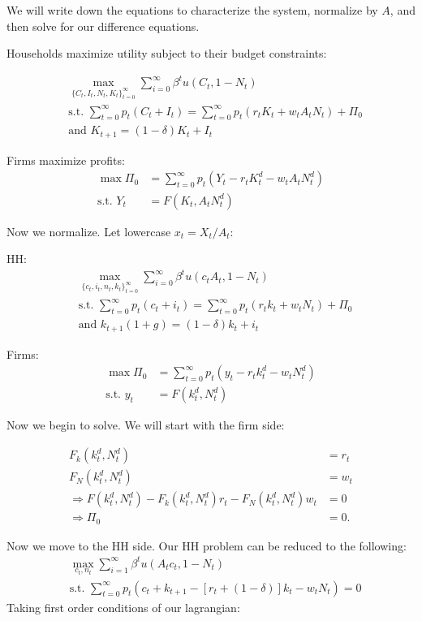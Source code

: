 \documentclass[11pt]{article} %
\begin{document}
We will write down the equations to characterize the system, normalize by $A$, and then solve for our difference equations. 

Households maximize utility subject to their budget constraints:

\begin{align*}
&\max_{\{C_t,I_t,N_t,K_t\}_{t=0}^{\infty}} \sum_{i=0}^{\infty}\beta^t u(C_t,1-N_t)\\
&\text{s.t. } \sum_{t=0}^{\infty} p_t (C_t + I_t) =  \sum_{t=0}^{\infty} p_t(r_tK_t + w_tA_tN_t) + \Pi_0\\
&\text{and } K_{t+1} = (1-\delta) K_t+ I_t
\end{align*}

Firms maximize profits:
\begin{align*}
\max \Pi_0 &=\sum_{t=0}^{\infty}p_t(Y_t -r_tK_t^d - w_t A_tN_t^d)\\
\text{s.t. } Y_t &= F(K_t,A_tN_t^d)
\end{align*}

Now we normalize. Let lowercase $x_t = X_t/A_t$:

HH:
\begin{align*}
&\max_{\{c_t,i_t,n_t,k_t\}_{t=0}^{\infty}} \sum_{i=0}^{\infty}\beta^t u(c_tA_t,1-N_t)\\
&\text{s.t. } \sum_{t=0}^{\infty} p_t (c_t + i_t) =  \sum_{t=0}^{\infty} p_t(r_tk_t + w_tN_t) + \Pi_0\\
&\text{and } k_{t+1}(1+g) = (1-\delta) k_t+ i_t
\end{align*}

Firms:
\begin{align*}
\max \Pi_0 &=\sum_{t=0}^{\infty}p_t(y_t -r_tk_t^d - w_t N_t^d)\\
\text{s.t. } y_t &= F(k_t^d,N_t^d)
\end{align*}

Now we begin to solve. We will start with the firm side:

\begin{align*}
F_k(k_t^d,N_t^d) &= r_t\\
F_N(k_t^d,N_t^d) &= w_t\\
\Rightarrow F(k_t^d,N_t^d) - F_k(k_t^d,N_t^d) r_t - F_N(k_t^d,N_t^d) w_t &= 0 \\\Rightarrow \Pi_0 &= 0.
\end{align*}

Now we move to the HH side. Our HH problem can be reduced to the following:
\begin{align*}
&\max_{c_t,n_t} \sum_{i=1}^{\infty}\beta^t u(A_tc_t,1-N_t)\\
&\text{s.t. } \sum_{t=0}^{\infty} p_t ( c_t + k_{t+1} - [r_t + (1-\delta)]k_t - w_tN_t ) = 0
\end{align*}
Taking first order conditions of our lagrangian:
\end{document}
